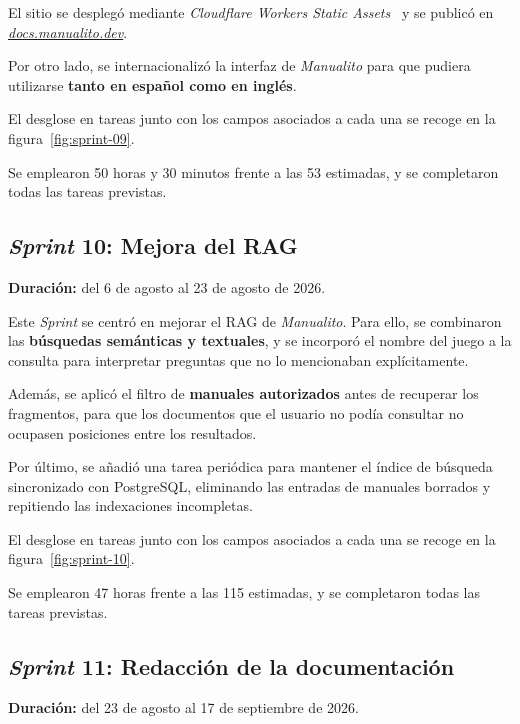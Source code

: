 El sitio se desplegó mediante
\textit{Cloudflare Workers Static Assets}~\cite{cloudflare_workers_static_assets}
y se publicó en \href{https://docs.manualito.dev/}{\textit{docs.manualito.dev}}.

Por otro lado, se internacionalizó la interfaz de \textit{Manualito} para que
pudiera utilizarse \textbf{tanto en español como en inglés}.

El desglose en tareas junto con los campos asociados a cada una se
recoge en la figura~\ref{fig:sprint-09}.


Se emplearon 50 horas y 30 minutos frente a las 53 estimadas, y se
completaron todas las tareas previstas.

\subsection{\textit{Sprint} 10: Mejora del \acs{RAG}}
\textbf{Duración:} del 6 de agosto al 23 de agosto de 2026.

Este \textit{Sprint} se centró en mejorar el \ac{RAG} de \textit{Manualito}.
Para ello, se combinaron las \textbf{búsquedas semánticas y textuales}, y se
incorporó el nombre del juego a la consulta para interpretar preguntas que
no lo mencionaban explícitamente.

Además, se aplicó el filtro de \textbf{manuales autorizados} antes de
recuperar los fragmentos, para que los documentos que el usuario no podía
consultar no ocupasen posiciones entre los resultados.

Por último, se añadió una tarea periódica para mantener el índice de
búsqueda sincronizado con PostgreSQL, eliminando las entradas de manuales
borrados y repitiendo las indexaciones incompletas.

El desglose en tareas junto con los campos asociados a cada una se
recoge en la figura~\ref{fig:sprint-10}.


Se emplearon 47 horas frente a las 115 estimadas, y se completaron todas las tareas previstas.

\subsection{\textit{Sprint} 11: Redacción de la documentación}
\textbf{Duración:} del 23 de agosto al 17 de septiembre de 2026.


